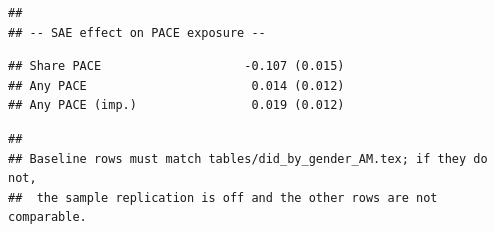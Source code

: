 \documentclass[
]{article}
\begin{document}
\begin{verbatim}
## 
## -- SAE effect on PACE exposure --
\end{verbatim}

\begin{verbatim}
## Share PACE                    -0.107 (0.015)
## Any PACE                       0.014 (0.012)
## Any PACE (imp.)                0.019 (0.012)
\end{verbatim}

\begin{verbatim}
## 
## Baseline rows must match tables/did_by_gender_AM.tex; if they do not,
##  the sample replication is off and the other rows are not comparable.
\end{verbatim}
\end{document}
